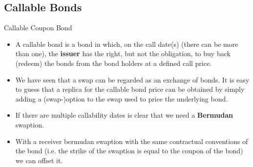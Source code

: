 \documentclass{beamer}
\begin{document}
%

\subsection{Callable Bonds}
\begin{frame}{Callable Coupon Bond}
	\begin{itemize}
		\item<1-> A \textcolor{maincolor}{callable bond} is a bond in which, on the call date(s) (there can be more than one), the \textbf{issuer} has the right, but not the obligation, to buy back (redeem) the bonds from the bond holders at a defined call price.
		\item<2-> We have seen that a swap can be regarded as an exchange of bonds. It is easy to guess that a replica for the callable bond price can be obtained by simply adding a (swap-)option to the swap used to price the underlying bond.
		\item<3-> If there are multiple callability dates is clear that we need a \textbf{Bermudan} swaption.
		\item<3-> With a receiver bermudan swaption with the same contractual conventions of the bond (i.e. the strike of the swaption is equal to the coupon of the bond) we can offset it. %
	\end{itemize}
\end{frame}
\end{document}
